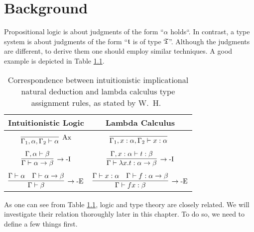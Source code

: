 \chapter{Background}\label{chap:background}

Propositional logic is about judgments of the form ``$\alpha$ holds``. In contrast, a type system is about judgments of the form ``$\mathfrak{t}$ is of type $\mathfrak{T}$''. Although the judgments are different, to derive them one should employ similar techniques. A good example is depicted in Table \ref{tab:natural-deduction-lambda-calculus-correspondence}.

\begin{table}[!ht]
    \centering
    \begin{tabular}{c|c}
        Intuitionistic Logic & Lambda Calculus \\
        \hline \\
        $\infer[\mbox{Ax}]{\Gamma_1, \alpha, \Gamma_2 \vdash \alpha}{}$ & $\infer[]{\Gamma_1, x : \alpha, \Gamma_2 \vdash x : \alpha}{}$ \\ \\
        $\infer[\rightarrow\mbox{-I}]{\Gamma \vdash \alpha \rightarrow \beta}{\Gamma, \alpha \vdash \beta}$ & $\infer[\rightarrow\mbox{-I}]{\Gamma \vdash \lambda x. t : \alpha \rightarrow \beta}{\Gamma, x : \alpha \vdash t : \beta}$ \\ \\
        $\infer[\rightarrow\mbox{-E}]{\Gamma \vdash \beta}{\Gamma \vdash \alpha & \Gamma \vdash \alpha \rightarrow \beta}$ & $\infer[\rightarrow\mbox{-E}]{\Gamma \vdash f x : \beta}{\Gamma \vdash x : \alpha & \Gamma \vdash f : \alpha \rightarrow \beta}$
    \end{tabular}
    \caption{Correspondence between 
intuitionistic implicational natural deduction and lambda calculus type assignment rules, as stated by W.~H.~\cite{Howard1969TheFN}}
    \label{tab:natural-deduction-lambda-calculus-correspondence}
\end{table}

As one can see from Table \ref{tab:natural-deduction-lambda-calculus-correspondence}, logic and type theory are closely related. We will investigate their relation thoroughly later in this chapter. To do so, we need to define a few things first.






